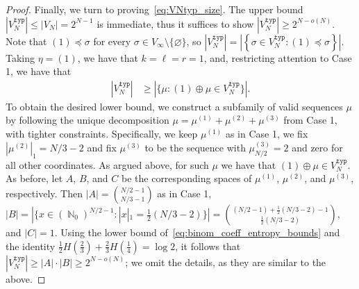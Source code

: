 \documentclass[11pt]{article}
\numberwithin{equation}{section}
\DeclareMathOperator{\N}{\mathbb{N}} %
\theoremstyle{definition}
\begin{document}
\begin{proof}

Finally, we turn to proving~\eqref{eq:VNtyp_size}.  The upper bound $\left| V_{N}^{\mathtt{typ}} \right| \leq \left| V_{N} \right| = 2^{N-1}$ is immediate, thus it suffices to show $\left| V_{N}^{\mathtt{typ}} \right| \geq 2^{N - o(N)}$. Note that 
$(1) \preccurlyeq \sigma$ for every $\sigma \in V_{\infty} \setminus \{\varnothing\}$, 
so 
$\left| V_{N}^{\mathtt{typ}} \right| 
= \left| \left\{ \sigma \in V_{N}^{\mathtt{typ}} : (1) \preccurlyeq \sigma \right\} \right|$. 
Taking $\eta = (1)$, we have that $k= \ell = r =1$, and, restricting attention to Case 1, we have that
\begin{align*}
    \left| V_{N}^{\mathtt{typ}} \right| & \geq \left|\{\mu: (1)  \oplus \mu \in V_N^{\mathtt{typ}}\} \right|.
\end{align*}
To obtain the desired lower bound, we construct a subfamily of valid sequences $\mu$ by following the unique decomposition $\mu = \mu^{(1)}+\mu^{(2)} + \mu^{(3)}$ from Case 1, with tighter constraints. Specifically, we keep $\mu^{(1)}$ as in Case 1, we fix $|\mu^{(2)}|_1 = N/3 -2$ and fix $\mu^{(3)}$ to be the sequence with $\mu_{N/2}^{(3)} = 2$ and zero for all other coordinates. As argued above, for such $\mu$ we have that $(1) \oplus \mu \in  V_N^{\mathtt{typ}}$.  As before, let $A$, $B$, and $C$ be the corresponding spaces of $\mu^{(1)}$, $\mu^{(2)}$, and $\mu^{(3)}$, respectively. 
Then $|A| = \binom{N/2 -1}{N/3 -1}$ as in Case 1, 
$|B| = |\{ x \in (\N_0)^{N/2-1}: |x|_1 = \frac{1}{2}(N/3 -2)\}| = \binom{(N/2-1) +  \frac{1}{2}(N/3 -2) - 1}{ \frac{1}{2}(N/3 -2)}$, 
and $|C|=1$. 
Using the lower bound of~\eqref{eq:binom_coeff_entropy_bounds} and the identity 
$\frac{1}{2} H \left( \frac{2}{3} \right) + \frac{2}{3} H \left( \frac{1}{4} \right) = \log 2$, 
it follows that $\left| V_{N}^{\mathtt{typ}} \right| \geq |A| \cdot |B| \geq 2^{N - o(N)}$; we omit the details, as they are similar to the above.
\end{proof}
\end{document}

